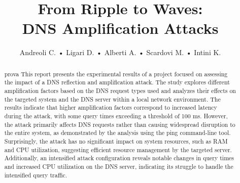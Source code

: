 \documentclass{class}
\title{From Ripple to Waves:\\ DNS Amplification Attacks}
\author{Andreoli C. • Ligari D. • Alberti A. • Scardovi M. • Intini K.}
\affil[1]{Department of Computer Engineering - Data Science, University of Pavia, Italy \newline\centering Course of Enterprise digital infrastructure}
\begin{document}
\maketitle
\begin{abstract}
    prova
	This report presents the experimental results of a project focused on assessing the impact of a DNS reflection and amplification attack.
	The study explores different amplification factors based on the DNS request types used and analyzes their effects on the targeted system
	and the DNS server within a local network environment.
	The results indicate that higher amplification factors correspond to increased latency during the attack,
	with some query times exceeding a threshold of 100 ms.
	However, the attack primarily affects DNS requests rather than causing widespread disruption to the entire system,
	as demonstrated by the analysis using the ping command-line tool.
	Surprisingly, the attack has no significant impact on system resources, such as RAM and CPU utilization,
	suggesting efficient resource management by the targeted server.
	Additionally, an intensified attack configuration reveals notable changes in query times and increased CPU utilization on the DNS server,
	indicating its struggle to handle the intensified query traffic.

\end{abstract}
\begin{multicols}{2}
    \tableofcontents
	\nocite{dizdar_dns_2021}
	\nocite{dnsbaseddos}
	\nocite{taylor_four_2021}
	\nocite{DNSattackstype}
	\nocite{Devi_2015}
    
	
	
	
	
	
	
	
	
	
    \clearpage
	\printbibliography
\end{multicols}
\end{document}
